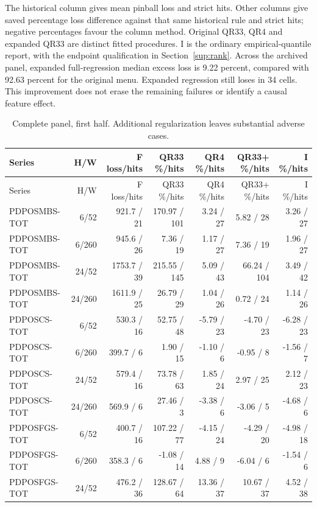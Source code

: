 \documentclass[11pt,a4paper]{article}
\begin{document}
The historical column gives mean pinball loss and strict hits. Other columns
give saved percentage loss difference against that same historical rule and
strict hits; negative percentages favour the column method. Original QR33,
QR4 and expanded QR33 are distinct fitted procedures. I is the ordinary
empirical-quantile report, with the endpoint qualification in Section~\ref{sup:rank}.
Across the archived panel, expanded full-regression median excess
loss is 9.22 percent,
compared with 92.63 percent for the original menu. Expanded regression still loses in 34 cells.
This improvement does not erase the remaining failures or identify a causal
feature effect.\begingroup
\scriptsize
\setlength{\tabcolsep}{3pt}
\renewcommand{\arraystretch}{1.12}
\begin{longtable}{p{26mm}rrrrrr}
\caption{Complete panel, first half. Additional regularization leaves substantial adverse cases.}\\
\toprule
Series & H/W & F loss/hits & QR33 \%/hits & QR4 \%/hits & QR33+ \%/hits & I \%/hits \\
\midrule
\endfirsthead
\toprule
Series & H/W & F loss/hits & QR33 \%/hits & QR4 \%/hits & QR33+ \%/hits & I \%/hits \\
\midrule
\endhead
\bottomrule
\endfoot
PDPOSMBS-TOT & 6/52 & 921.7 / 21 & 170.97 / 101 & 3.24 / 27 & 5.82 / 28 & 3.26 / 27 \\
PDPOSMBS-TOT & 6/260 & 945.6 / 26 & 7.36 / 19 & 1.17 / 27 & 7.36 / 19 & 1.96 / 27 \\
PDPOSMBS-TOT & 24/52 & 1753.7 / 39 & 215.55 / 145 & 5.09 / 43 & 66.24 / 104 & 3.49 / 42 \\
PDPOSMBS-TOT & 24/260 & 1611.9 / 25 & 26.79 / 29 & 1.04 / 26 & 0.72 / 24 & 1.14 / 26 \\
PDPOSCS-TOT & 6/52 & 530.3 / 16 & 52.75 / 48 & -5.79 / 23 & -4.70 / 23 & -6.28 / 23 \\
PDPOSCS-TOT & 6/260 & 399.7 / 6 & 1.90 / 15 & -1.10 / 6 & -0.95 / 8 & -1.56 / 7 \\
PDPOSCS-TOT & 24/52 & 579.4 / 16 & 73.78 / 63 & 1.85 / 24 & 2.97 / 25 & 2.12 / 23 \\
PDPOSCS-TOT & 24/260 & 569.9 / 6 & 27.46 / 3 & -3.38 / 6 & -3.06 / 5 & -4.68 / 6 \\
PDPOSFGS-TOT & 6/52 & 400.7 / 16 & 107.22 / 77 & -4.15 / 24 & -4.29 / 20 & -4.98 / 18 \\
PDPOSFGS-TOT & 6/260 & 358.3 / 6 & -1.08 / 14 & 4.88 / 9 & -6.04 / 6 & -1.54 / 6 \\
PDPOSFGS-TOT & 24/52 & 476.2 / 36 & 128.67 / 64 & 13.36 / 37 & 10.67 / 37 & 4.52 / 38 \\

\end{longtable}
\end{document}
